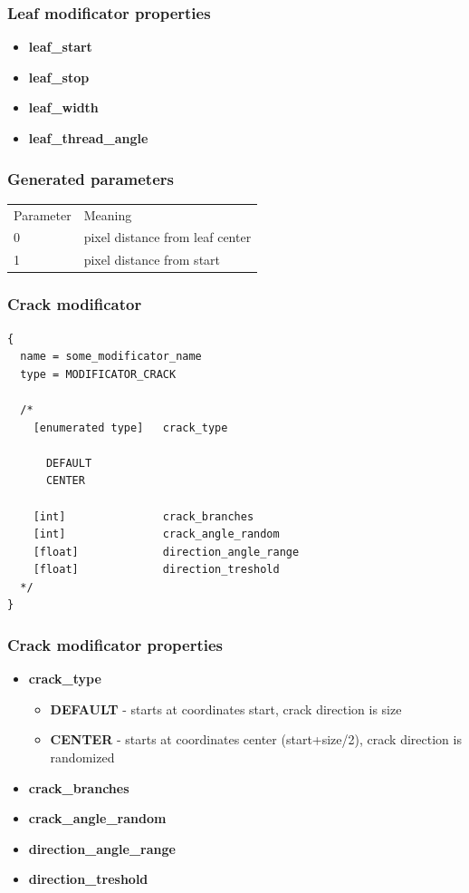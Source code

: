 \documentclass[9pt]{article}
\begin{document}
\subsubsection*{Leaf modificator properties}
\begin{itemize}
\item{\bf leaf\_start}
\item{\bf leaf\_stop}
\item{\bf leaf\_width}
\item{\bf leaf\_thread\_angle}
\end{itemize}

\subsubsection*{Generated parameters}

\begin{tabular}{|l||l|}
  Parameter & Meaning \\
  0 & pixel distance from leaf center \\
  1 & pixel distance from start \\  
\end{tabular}

\subsubsection{Crack modificator}

\begin{verbatim}
{
  name = some_modificator_name
  type = MODIFICATOR_CRACK

  /*
    [enumerated type]   crack_type
    
      DEFAULT
      CENTER

    [int]               crack_branches
    [int]               crack_angle_random
    [float]             direction_angle_range
    [float]             direction_treshold
  */
}
\end{verbatim}
\subsubsection*{Crack modificator properties}
\begin{itemize}
\item{\bf crack\_type}
\begin{itemize}
\item{\bf DEFAULT} - starts at coordinates start, crack direction is size
\item{\bf CENTER} - starts at coordinates center (start+size/2), 
crack direction is randomized
\end{itemize}
\item{\bf crack\_branches}
\item{\bf crack\_angle\_random}
\item{\bf direction\_angle\_range}
\item{\bf direction\_treshold}
\end{itemize}
\end{document}
